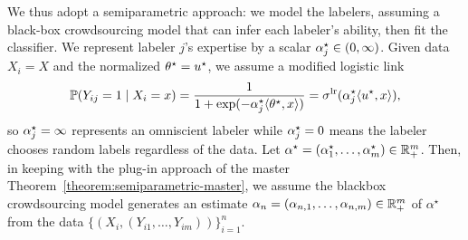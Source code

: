 
We thus adopt a semiparametric approach: we model the labelers, assuming a
black-box crowdsourcing model that can infer each labeler's ability, then
fit the classifier.  We represent labeler $j$'s expertise by a scalar
$\alpha_j^\star \in (0, \infty)$. Given data $X_i = X$ and the normalized
$\theta^\star = u^\star$, we assume a modified logistic link
\begin{align*}
	\mathbb{P}(Y_{ij} = 1 \mid X_i = x) = \frac{1}{1 + \exp (-\alpha^\star_j  \langle \theta^\star, x \rangle)} = \sigma^{\textup{lr}} (\alpha_j^\star  \langle u ^\star, x \rangle),
\end{align*}
so $\alpha_j^\star = \infty$ represents an omniscient labeler while
$\alpha_j^\star = 0$ means the labeler chooses random labels regardless of the
data. Let $\alpha^\star = (\alpha_1^\star, \ldots, \alpha_m^\star) \in
\mathbb{R}^m_{+}$. Then, in keeping with the plug-in approach of the master
Theorem~\ref{theorem:semiparametric-master}, we assume the blackbox
crowdsourcing model generates an estimate $\alpha_n = (\alpha_{n,1},
\ldots, \alpha_{n,m}) \in \mathbb{R}_+^m$ of $\alpha^\star$ from the data $\{(X_i,
(Y_{i1}, \ldots, Y_{im}))\}_{i=1}^n$.





